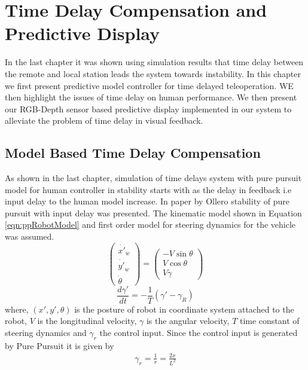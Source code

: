 \chapter{Time Delay Compensation and Predictive Display}
\label{ch_7:PDsply}
In the last chapter it was shown using simulation results that time delay between the remote and local station leads the system towards instability. In this chapter we first present predictive model controller for time delayed teleoperation. WE then highlight the issues of time delay on human performance. We then present our  RGB-Depth sensor based  predictive display implemented in our system  to alleviate the problem of time delay in visual feedback.

\section {Model Based Time Delay Compensation}
As shown in the last chapter, simulation of time delays system with pure pursuit model for human controller in stability starts with as the delay in feedback i.e input delay to the human model increase. In paper by Ollero \cite{ollero1995stability} stability of pure pursuit with input delay was presented. The kinematic model shown in Equation \ref{eqn:ppRobotModel}  and first order model for steering dynamics for the vehicle was assumed. 
\begin{equation}
\label{eqn:ppRobotModel}
\begin{pmatrix}
\dot{x'}_w\\ \dot{y'}_w\\ \dot{\theta}
\end{pmatrix}
=
\begin{pmatrix}
-V \sin\theta\\ V\cos\theta\\V\gamma
\end{pmatrix}
\end{equation}
\begin{equation}
\label{eqn:ppSteering}
\frac{d\gamma'}{dt}=-\frac{1}{T}(\gamma'-\gamma_R)
\end{equation}
where, $(x',y',\theta)$ is the posture of robot in coordinate system attached to the robot,  $V$  is the longitudinal velocity,  $\gamma$ is the angular velocity, $T$ time constant of steering dynamics and $\gamma_r$ the control input.  Since the control input is generated by Pure Pursuit it is given by
\begin{eqnarray}
\gamma_r=\frac{1}{r}=\frac{2x}{L^2}
\end{eqnarray} 
